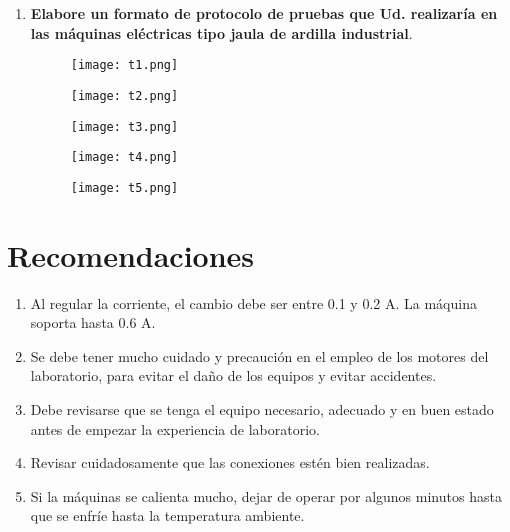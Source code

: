 \documentclass[a4paper,11pt]{article}
\newcommand{\mrm}{\mathrm}
\begin{document}
\begin{enumerate}
\begin{table}[H]
        \caption{Datos calculados para $P_{\mrm{rotacional}}$}
    \end{table}
    \item \textbf{Elabore un formato de protocolo de pruebas que Ud. realizaría en las máquinas eléctricas tipo jaula de ardilla industrial}.
    \begin{figure}[H]
        \centering
        \texttt{[image: t1.png]}
    \end{figure}
    \begin{figure}[H]
        \centering
        \texttt{[image: t2.png]}
    \end{figure}
    \begin{figure}[H]
        \centering
        \texttt{[image: t3.png]}
    \end{figure}
    \begin{figure}[H]
        \centering
        \texttt{[image: t4.png]}
    \end{figure}
    \begin{figure}[H]
        \centering
        \texttt{[image: t5.png]}
    \end{figure}
\end{enumerate}
\newpage
\section{Recomendaciones}
\begin{enumerate}
    \item Al regular la corriente, el cambio debe ser entre 0.1 y 0.2 A. La máquina soporta hasta 0.6 A.
    \item Se debe tener mucho cuidado y precaución en el empleo de los motores del laboratorio, para evitar el daño de los equipos y evitar accidentes.
    \item Debe revisarse que se tenga el equipo necesario, adecuado y en buen estado antes de empezar la experiencia de laboratorio.
    \item Revisar cuidadosamente que las conexiones estén bien realizadas.
    \item Si la máquinas se calienta mucho, dejar de operar por algunos minutos hasta que se enfríe hasta la temperatura ambiente.
\end{enumerate}
\end{document}
